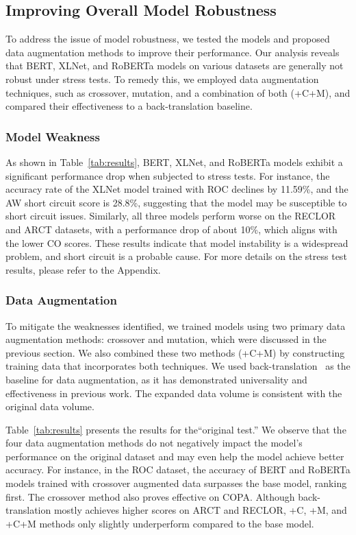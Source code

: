 \subsection{Improving Overall Model Robustness}
\label{sec:robust}
To address the issue of model robustness, we tested the models and proposed data augmentation methods to improve their performance. Our analysis reveals that BERT, XLNet, and RoBERTa models on various datasets are generally not robust under stress tests. To remedy this, we employed data augmentation techniques, such as crossover, mutation, and a combination of both (+C+M), and compared their effectiveness to a back-translation baseline.

\subsubsection{Model Weakness}
As shown in Table~\ref{tab:results}, BERT, XLNet, and RoBERTa models exhibit a significant performance drop when subjected to stress tests. For instance, the accuracy rate of the XLNet model trained with ROC declines by 11.59\%, and the AW short circuit score is 28.8\%, suggesting that the model may be susceptible to short circuit issues. Similarly, all three models perform worse on the RECLOR and ARCT datasets, with a performance drop of about 10\%, which aligns with the lower CO scores. These results indicate that model instability is a widespread problem, and short circuit is a probable cause. For more details on the stress test results, please refer to the Appendix.

\subsubsection{Data Augmentation}
To mitigate the weaknesses identified, we trained models using two primary data augmentation methods: crossover and mutation, which were discussed in the previous section. We also combined these two methods (+C+M) by constructing training data that incorporates both techniques. We used back-translation~\cite{back2019} as the baseline for data augmentation, as it has demonstrated universality and effectiveness in previous work. The expanded data volume is consistent with the original data volume.

Table~\ref{tab:results} presents the results for the``original test.'' We observe that the four data augmentation methods do not negatively impact the model's performance on the original dataset and may even help the model achieve better accuracy. For instance, in the ROC dataset, the accuracy of BERT and RoBERTa models trained with crossover augmented data surpasses the base model, ranking first. The crossover method also proves effective on COPA. Although back-translation mostly achieves higher scores on ARCT and RECLOR, +C, +M, and +C+M methods only slightly underperform compared to the base model.

